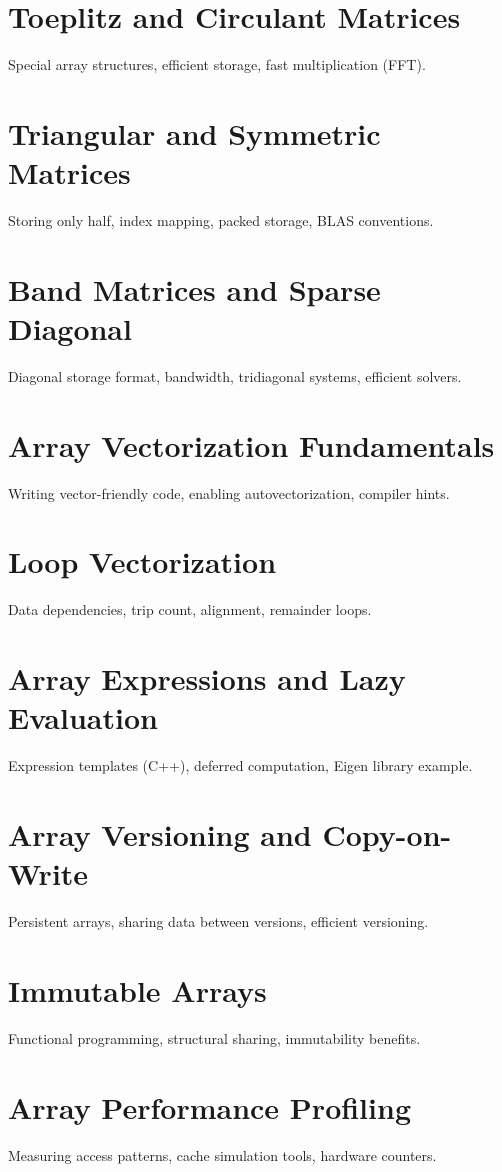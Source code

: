 \chapter{Toeplitz and Circulant Matrices}
Special array structures, efficient storage, fast multiplication (FFT).

\chapter{Triangular and Symmetric Matrices}
Storing only half, index mapping, packed storage, BLAS conventions.

\chapter{Band Matrices and Sparse Diagonal}
Diagonal storage format, bandwidth, tridiagonal systems, efficient solvers.

\chapter{Array Vectorization Fundamentals}
Writing vector-friendly code, enabling autovectorization, compiler hints.

\chapter{Loop Vectorization}
Data dependencies, trip count, alignment, remainder loops.

\chapter{Array Expressions and Lazy Evaluation}
Expression templates (C++), deferred computation, Eigen library example.

\chapter{Array Versioning and Copy-on-Write}
Persistent arrays, sharing data between versions, efficient versioning.

\chapter{Immutable Arrays}
Functional programming, structural sharing, immutability benefits.

\chapter{Array Performance Profiling}
Measuring access patterns, cache simulation tools, hardware counters.

